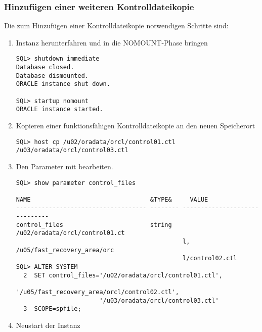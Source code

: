         \subsubsection{Hinzuf\"ugen einer weiteren Kontrolldateikopie}
          Die zum Hinzuf\"ugen einer Kontrolldateikopie notwendigen Schritte sind:
        \begin{enumerate}
          \item Instanz herunterfahren und in die NOMOUNT-Phase bringen
            \begin{lstlisting}[caption={Hinzuf\"ugen von Kontrolldateikopien 1},label=admin26,language=sqlplus]
SQL> shutdown immediate
Database closed.
Database dismounted.
ORACLE instance shut down.

SQL> startup nomount
ORACLE instance started.
            \end{lstlisting}
          \item Kopieren einer funktionsf\"ahigen Kontrolldateikopie an den neuen Speicherort
            \begin{lstlisting}[caption={L\"oschen von Kontrolldateikopien 3},label=admin26a,language=sqlplus]
SQL> host cp /u02/oradata/orcl/control01.ctl /u03/oradata/orcl/control03.ctl
            \end{lstlisting}
          \item Den Parameter  mit  bearbeiten.
            \begin{lstlisting}[caption={Hinzuf\"ugen von Kontrolldateikopien 2},label=admin27,language=oracle_sql,alsolanguage=sqlplus]
SQL> show parameter control_files

NAME                                 &TYPE&     VALUE
------------------------------------ -------- ------------------------------
control_files                        string   /u02/oradata/orcl/control01.ct
                                              l, /u05/fast_recovery_area/orc
                                              l/control02.ctl
SQL> ALTER SYSTEM
  2  SET control_files='/u02/oradata/orcl/control01.ctl',
                       '/u05/fast_recovery_area/orcl/control02.ctl',
                       '/u03/oradata/orcl/control03.ctl'
  3  SCOPE=spfile;
            \end{lstlisting}
          \item Neustart der Instanz
        \end{enumerate}

